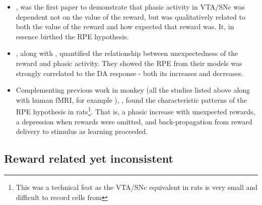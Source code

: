 \documentclass[doc]{apa}        %
\begin{document}
\begin{itemize}
\item {}, was the first paper to demonstrate that phasic activity in VTA/SNc was dependent not on the value of the reward, but was qualitatively related to both the value of the reward and how expected that reward was.  It, in essence birthed the RPE hypothesis.
\item {}, along with , quantified the relationship between unexpectedness of the reward and phasic activity.  They showed the RPE from their models was strongly correlated to the DA response - both its increases and decreases.
\item Complementing previous work in monkey (all the studies listed above along with human fMRI, for example ), , found the characteristic patterns of the RPE hypothesis in rats\footnote{This was a technical feat as the VTA/SNc equivalent in rats is very small and difficult to record cells from}.  That is, a phasic increase with unexpected rewards, a depression when rewards were omitted, and back-propagation from reward delivery to stimulus as learning proceeded.  
\end{itemize}


\subsection{Reward related yet inconsistent} %
\label{sub:incosistent_with_the_rpe_hypothesis}
\end{document}
